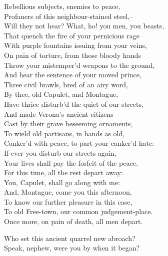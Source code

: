 \begin{speech}
Rebellious subjects, enemies to peace, \\
Profaners of this neighbour-stained steel,-- \\
Will they not hear?   What, ho! you men, you beasts, \\
That quench the fire of your pernicious rage \\
With purple fountains issuing from your veins, \\
On pain of torture, from those bloody hands \\
Throw your mistemper'd weapons to the ground, \\
And hear the sentence of your moved prince, \\
Three civil brawls, bred of an airy word, \\
By thee, old Capulet, and Montague, \\
Have thrice disturb'd the quiet of our streets, \\
And made Verona's ancient citizens \\
Cast by their grave beseeming ornaments, \\
To wield old partisans, in hands as old, \\
Canker'd with peace, to part your canker'd hate: \\
If ever you disturb our streets again, \\
Your lives shall pay the forfeit of the peace. \\
For this time, all the rest depart away: \\
You, Capulet, shall go along with me: \\
And, Montague, come you this afternoon, \\
To know our further pleasure in this case, \\
To old Free-town, our common judgement-place. \\
Once more, on pain of death, all men depart. 
\\
\end{speech}
\begin{speech}
Who set this ancient quarrel new abroach? \\
Speak, nephew, were you by when it began? \\
\end{speech}
